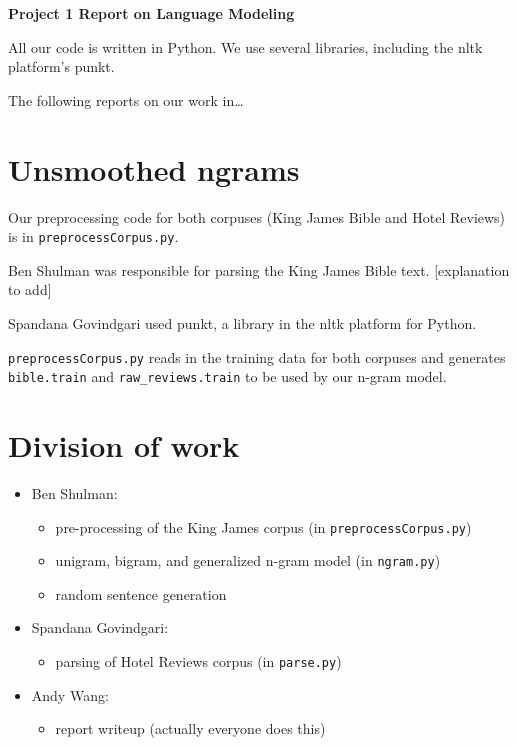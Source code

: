 \documentclass{article}
\begin{document}
\begin{center}\textbf{Project 1 Report on Language Modeling}\end{center}

All our code is written in Python. We use several libraries, including the nltk platform's punkt.\par
The following reports on our work in\ldots\par

\section{Unsmoothed ngrams}
Our preprocessing code for both corpuses (King James Bible and Hotel Reviews) is in \texttt{preprocessCorpus.py}.\par
Ben Shulman was responsible for parsing the King James Bible text. [explanation to add]\par
Spandana Govindgari used punkt, a library in the nltk platform for Python.\par
\texttt{preprocessCorpus.py} reads in the training data for both corpuses and generates \texttt{bible.train} and \texttt{raw\_reviews.train} to be used by our n-gram model.

\section{Division of work}
\begin{itemize}[noitemsep]
\item Ben Shulman:
  \begin{itemize}[noitemsep,nolistsep]
  \item pre-processing of the King James corpus (in \texttt{preprocessCorpus.py})
  \item unigram, bigram, and generalized n-gram model (in \texttt{ngram.py})
  \item random sentence generation
  \end{itemize}

\item Spandana Govindgari:
  \begin{itemize}[noitemsep,nolistsep]
  \item parsing of Hotel Reviews corpus (in \texttt{parse.py})

  \end{itemize}

\item Andy Wang:
  \begin{itemize}[noitemsep,nolistsep]
  \item report writeup (actually everyone does this)
  \end{itemize}
\end{itemize}
\end{document}
